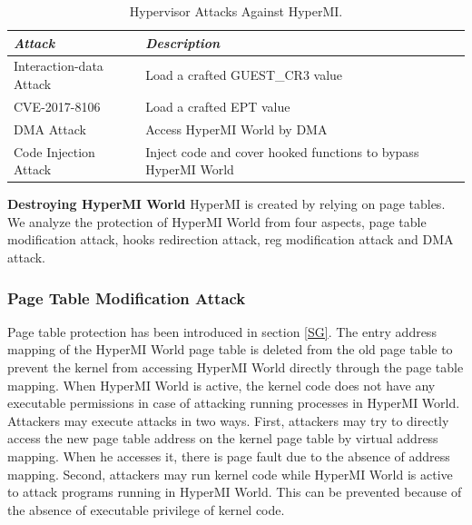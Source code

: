 \documentclass[conference]{IEEEtran}
\begin{document}
\begin{table}
\centering
\caption{Hypervisor Attacks Against HyperMI.}\label{tab3}
\begin{tabular}{p{2.8cm}|p{5.2cm}}
\hline
{\itshape\bfseries Attack} & {\itshape\bfseries Description} \\
\hline
Interaction-data Attack & Load a crafted GUEST\_CR3 value\\
\hline
CVE-2017-8106 & Load a crafted EPT value \\
\hline
DMA Attack & Access HyperMI World by DMA \\
\hline
Code Injection Attack & Inject code and cover hooked functions to bypass HyperMI World \\
\hline
\end{tabular}
\end{table}

\textbf{Destroying HyperMI World}
HyperMI is created by relying on page tables.
We analyze the protection of HyperMI World from four aspects, page table modification attack, hooks redirection attack, reg modification attack and DMA attack.


\subsubsection{Page Table Modification Attack}

Page table protection has been introduced in section \ref{SG}. The entry address mapping of the HyperMI World page table is deleted from the old page table to prevent the kernel from accessing HyperMI World directly through the page table mapping. When HyperMI World is active, the kernel code does not have any executable permissions in case of attacking running processes in HyperMI World. Attackers may execute attacks in two ways.
First, attackers may try to directly access the new page table address on the kernel page table by virtual address mapping. When he accesses it, there is page fault due to the absence of address mapping.
Second, attackers may run kernel code while HyperMI World is active to attack programs running in HyperMI World. This can be prevented because of the absence of executable privilege of kernel code.
\end{document}
